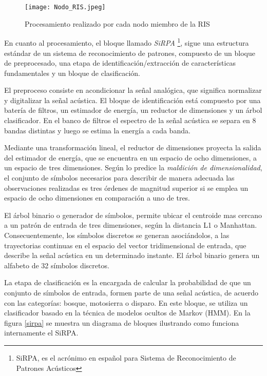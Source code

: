 \begin{figure}[h]
\texttt{[image: Nodo\_RIS.jpeg]}
\centering
\caption{Procesamiento realizado por cada nodo miembro de la RIS}
\label{nodoRIS}
\end{figure}


En cuanto al procesamiento, el bloque llamado \textit{SiRPA} \footnote{SiRPA, es el acrónimo en español para Sistema de Reconocimiento de Patrones Acústicos}, sigue una estructura estándar de un sistema de reconocimiento de patrones, compuesto de un bloque de preprocesado, una etapa de identificación/extracción de características fundamentales y un bloque de clasificación.

El preproceso consiste en acondicionar la señal analógica, que significa normalizar y digitalizar la señal acústica. El bloque de identificación está compuesto por una batería de filtros, un estimador de energía, un reductor de dimensiones y un árbol clasificador. En el banco de filtros el espectro de la señal acústica se separa en 8 bandas distintas y luego se estima la energía a cada banda.

Mediante una transformación lineal, el reductor de dimensiones proyecta la salida del estimador de energía, que se encuentra en un espacio de ocho dimensiones, a un espacio de tres dimensiones. Según lo predice la \textit{maldición de dimensionalidad}, el conjunto de símbolos necesarios para describir de manera adecuada las observaciones realizadas es tres órdenes de magnitud superior si se emplea un espacio de ocho dimensiones en comparación a uno de tres. \cite{NeuralNetworks, Jordanthesis}

El árbol binario o generador de símbolos, permite ubicar el centroide mas cercano a un patrón de entrada de tres dimensiones, según la distancia L1 o Manhattan. Consecuentemente, los símbolos discretos se generan asociándolos, a las trayectorias continuas en el espacio del vector tridimensional de entrada, que describe la señal acústica en un determinado instante. El árbol binario genera un alfabeto de 32 símbolos discretos. \cite{IEEE_Panama, TDS, Jcardenas, EmbededTech}

La etapa de clasificación es la encargada de calcular la probabilidad de que un conjunto de símbolos de entrada, formen parte de una señal acústica, de acuerdo con las categorías: bosque, motosierra o disparo. En este bloque, se utiliza un clasificador basado en la técnica de modelos ocultos de Markov (HMM). En la figura \ref{sirpa} se muestra un diagrama de bloques ilustrando como funciona internamente el SiRPA.

